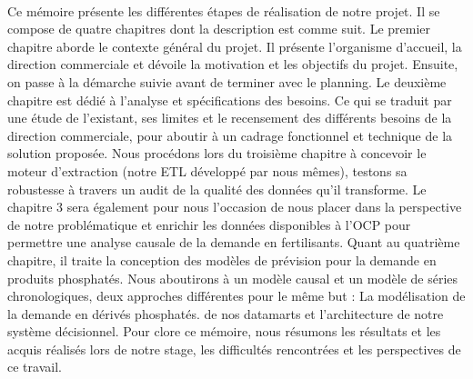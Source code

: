 \paragraph{}
Ce mémoire présente les différentes étapes de réalisation de notre projet. Il se compose de quatre
chapitres dont la description est comme suit.
Le premier chapitre aborde le contexte général du projet. Il présente l’organisme d’accueil, la
direction commerciale et dévoile la motivation et les objectifs du projet. Ensuite, on passe à la
démarche suivie avant de terminer avec le planning.
Le deuxième chapitre est dédié à l’analyse et spécifications des besoins. Ce qui se traduit par
une étude de l’existant, ses limites et le recensement des différents besoins de la direction
commerciale, pour aboutir à un cadrage fonctionnel et technique de la solution proposée. Nous procédons lors du troisième chapitre à concevoir le moteur d'extraction (notre ETL développé par nous mêmes), testons sa robustesse à travers un audit de la qualité des données qu'il transforme. Le chapitre 3 sera également pour nous l'occasion de nous placer dans la perspective de notre problématique et enrichir les données disponibles à l'OCP pour permettre une analyse causale de la demande en fertilisants. Quant au quatrième chapitre, il traite la conception des modèles de prévision pour la demande en produits phosphatés. Nous aboutirons à un modèle causal et un modèle de séries chronologiques, deux approches différentes pour le même but : La modélisation de la demande en dérivés phosphatés. de nos
datamarts et l’architecture de notre système décisionnel. Pour clore ce mémoire, nous résumons les résultats et les acquis réalisés lors de notre stage, les
difficultés rencontrées et les perspectives de ce travail.
